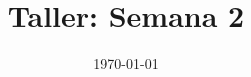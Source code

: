 \documentclass[a4paper]{article}
\date{\today}
\title{Taller: Semana 2}
\begin{document}
    \header{}

    \begin{answer}[Problema 1.]
    \begin{enumerate}
       
            
            
    \end{enumerate}
    
    
    
    
    
    
    

        
    \end{answer}
    
\end{document}
